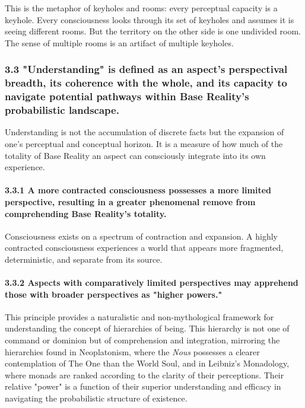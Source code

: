 This is the metaphor of keyholes and rooms: every perceptual capacity is a keyhole. Every consciousness looks through its set of keyholes and assumes it is seeing different rooms. But the territory on the other side is one undivided room. The sense of multiple rooms is an artifact of multiple keyholes.


\subsubsection*{3.3 "Understanding" is defined as an aspect's perspectival breadth, its coherence with the whole, and its capacity to navigate potential pathways within Base Reality's probabilistic landscape.}


Understanding is not the accumulation of discrete facts but the expansion of one's perceptual and conceptual horizon. It is a measure of how much of the totality of Base Reality an aspect can consciously integrate into its own experience.


\paragraph*{3.3.1 A more contracted consciousness possesses a more limited perspective, resulting in a greater phenomenal remove from comprehending Base Reality's totality.}


Consciousness exists on a spectrum of contraction and expansion. A highly contracted consciousness experiences a world that appears more fragmented, deterministic, and separate from its source.


\paragraph*{3.3.2 Aspects with comparatively limited perspectives may apprehend those with broader perspectives as "higher powers."}


This principle provides a naturalistic and non-mythological framework for understanding the concept of hierarchies of being. This hierarchy is not one of command or dominion but of comprehension and integration, mirroring the hierarchies found in Neoplatonism, where the \textit{Nous} possesses a clearer contemplation of The One than the World Soul, and in Leibniz's Monadology, where monads are ranked according to the clarity of their perceptions. Their relative "power" is a function of their superior understanding and efficacy in navigating the probabilistic structure of existence.


